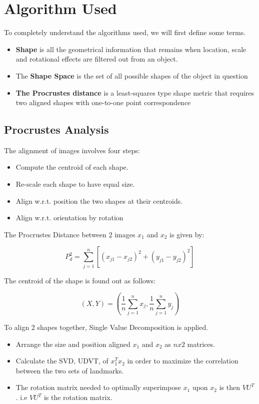 \documentclass[paper=a4, fontsize=11pt,twoside]{scrartcl}	%
\begin{document}
\newpage
\section{Algorithm Used}
To completely understand the algorithms used, we will first define some terms.
\begin{itemize}
\item \textbf{Shape} is all the geometrical information that remains when location,
scale and rotational eﬀects are ﬁltered out from an object.
\item The \textbf{Shape Space} is the set of all possible shapes of the object in question
\item \textbf{The Procrustes distance} is a least-squares type shape metric that requires two aligned shapes with
one-to-one point correspondence
\end{itemize}

\subsection{Procrustes Analysis}
The alignment of images involves four steps:
\begin{itemize}
\item Compute the centroid of each shape.
\item Re-scale each shape to have equal size.
\item Align w.r.t. position the two shapes at their centroids.
\item Align w.r.t. orientation by rotation
\end{itemize}

The Procrustes Distance between 2 images $x_{1}$ and $x_{2}$ is given by:

$$ P_{d}^2 = \sum\limits_{j=1}^n [(x_{j1} - x_{j2})^2 + (y_{j1} - y_{j2})^2] $$ 

The centroid of the shape is found out as follows:

$$ (X,Y) = (\frac{1}{n} \sum\limits_{j=1}^n x_{j} , \frac{1}{n} \sum\limits_{j=1}^n y_{j})$$

To align 2 shapes together, Single Value Decomposition is applied.
\begin{itemize}
\item Arrange the size and position aligned $x_{1}$ and $x_{2}$ as $nx2$ matrices.
\item Calculate the SVD, UDVT, of $x_{1}^Tx_{2}$ in order to maximize the correlation between the two sets of landmarks.
\item The rotation matrix needed to optimally superimpose $x_{1}$ upon $x_{2}$ is then $VU^T$. i.e $VU^T$ is the rotation matrix.
\end{itemize}
\end{document}
